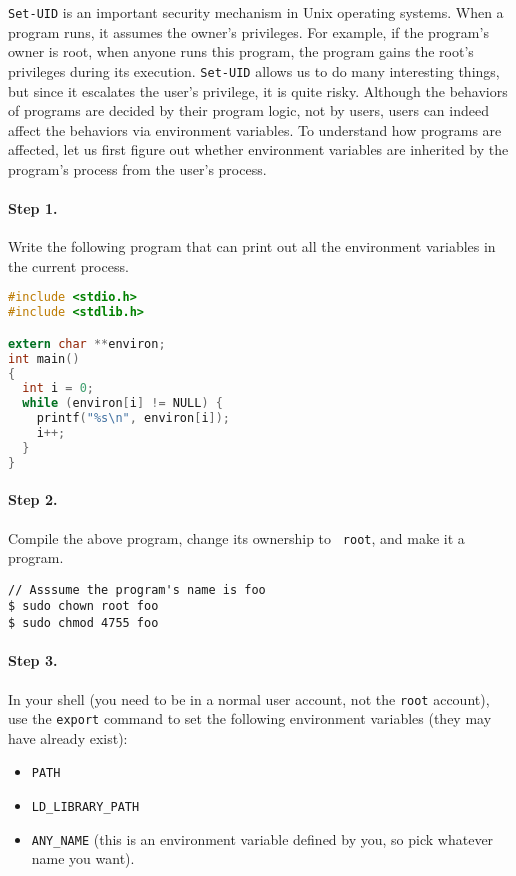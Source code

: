 {\tt Set-UID} is an important security mechanism in Unix operating systems.
When a \setuid program runs, it assumes the owner's privileges. For
example, if the program's owner is root, when anyone runs this
program, the program gains the root's privileges during its execution. 
{\tt Set-UID} allows us to do many interesting things, but since 
it escalates the user's privilege, it is quite risky. Although the
behaviors of \setuid programs are decided by their program logic, not by
users, users can indeed affect the behaviors via environment variables.
To understand how \setuid programs are affected, let us first figure out
whether environment variables are inherited by the \setuid program's
process from the user's process.


\paragraph{Step 1.} Write the following program that can print out all
the environment variables in the current process.

\begin{lstlisting}[language=C]
#include <stdio.h>
#include <stdlib.h>

extern char **environ;
int main()
{
  int i = 0;
  while (environ[i] != NULL) {
    printf("%s\n", environ[i]);
    i++;
  }
}
\end{lstlisting}


\paragraph{Step 2.} Compile the above program, change its ownership to {\tt
root}, and make it a \setuid program.

\begin{lstlisting}
// Asssume the program's name is foo
$ sudo chown root foo
$ sudo chmod 4755 foo
\end{lstlisting}



\paragraph{Step 3.} In your shell (you need to be in a normal user account,
not the {\tt root} account), use the {\tt export} command to set the
following environment variables (they may have already exist):

\begin{itemize}[noitemsep]
\item {\tt PATH}
\item {\tt LD\_LIBRARY\_PATH}
\item {\tt ANY\_NAME} (this is an environment variable defined by you, so
pick whatever name you want).
\end{itemize}



